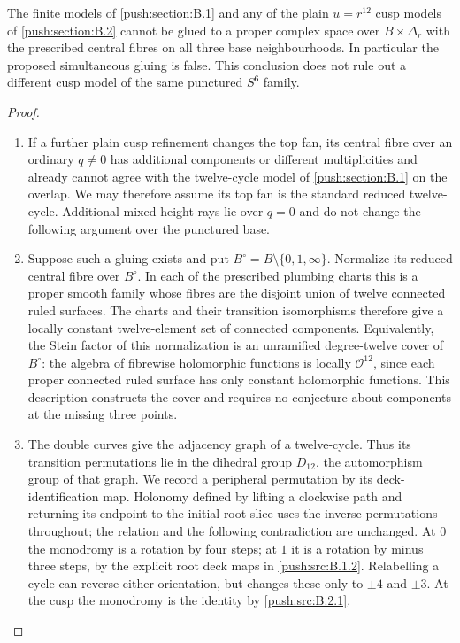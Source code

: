\begin{theorem}\hypertarget{tag-0305}{}\label{push:src:B.3.1}\label{push:B31}

The finite models of \ref{push:section:B.1} and any of the plain
$u=r^{12}$ cusp models of \ref{push:section:B.2} cannot be glued to a
proper complex space over $B\times\Delta_r$ with
the prescribed central fibres on all three base
neighbourhoods. In particular the proposed simultaneous gluing is false. This conclusion does
not rule out a different cusp model of the same
punctured $S^6$ family.
\end{theorem}


\begin{proof}
\begin{enumerate}[label=\arabic*.,leftmargin=*]
\item If a further plain cusp refinement changes the top fan,
its central fibre over an ordinary $q\ne0$ has additional
components or different multiplicities and already cannot
agree with the twelve-cycle model of \ref{push:section:B.1} on the overlap.
We may therefore assume its top fan is the standard reduced
twelve-cycle. Additional mixed-height rays lie over $q=0$
and do not change the following argument over the punctured
base.

\item Suppose such a gluing exists and put
$B^\circ=B\setminus\{0,1,\infty\}$. Normalize
its reduced central fibre over $B^\circ$. In
each of the prescribed plumbing charts this is
a proper smooth family whose fibres are the
disjoint union of twelve connected ruled
surfaces. The charts and their transition
isomorphisms therefore give a locally constant
twelve-element set of connected components.
Equivalently, the Stein factor of this
normalization is an unramified degree-twelve
cover of $B^\circ$: the algebra of fibrewise
holomorphic functions is locally $\mathcal O^{12}$,
since each proper connected ruled surface has
only constant holomorphic functions. This
description constructs the cover and requires
no conjecture about components at the missing
three points.

\item The double curves give the adjacency graph of
a twelve-cycle. Thus its transition
permutations lie in the dihedral group
$D_{12}$, the automorphism group of that graph.
We record a peripheral permutation by its
deck-identification map. Holonomy defined by
lifting a clockwise path and returning its
endpoint to the initial root slice uses the
inverse permutations throughout; the relation
and the following contradiction are unchanged.
At $0$ the monodromy is a rotation by four
steps; at $1$ it is a rotation by minus three
steps, by the explicit root deck maps in
\ref{push:src:B.1.2}. Relabelling a cycle can reverse either
orientation, but changes these only to
$\pm4$ and $\pm3$. At the cusp the
monodromy is the identity by \ref{push:src:B.2.1}.


\end{enumerate}
\end{proof}
